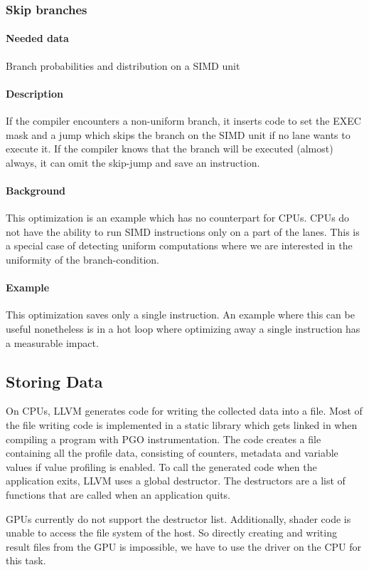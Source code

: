 \subsubsection{Skip branches}
\paragraph{Needed data} Branch probabilities and distribution on a SIMD unit
\paragraph{Description} If the compiler encounters a non-uniform branch, it inserts code to set the EXEC mask and a jump which skips the branch on the SIMD unit if no lane wants to execute it. If the compiler knows that the branch will be executed (almost) always, it can omit the skip-jump and save an instruction.
\paragraph{Background} This optimization is an example which has no counterpart for CPUs. CPUs do not have the ability to run SIMD instructions only on a part of the lanes. This is a special case of detecting uniform computations where we are interested in the uniformity of the branch-condition.
\paragraph{Example} This optimization saves only a single instruction. An example where this can be useful nonetheless is in a hot loop where optimizing away a single instruction has a measurable impact.

\subsection{Storing Data}
\label{sub:save-design}
On CPUs, LLVM generates code for writing the collected data into a file.
Most of the file writing code is implemented in a static library which gets linked in when compiling a program with PGO instrumentation.
The code creates a file containing all the profile data, consisting of counters, metadata and variable values if value profiling is enabled.
To call the generated code when the application exits, LLVM uses a global destructor.
The destructors are a list of functions that are called when an application quits.

GPUs currently do not support the destructor list. Additionally, shader code is unable to access the file system of the host.
So directly creating and writing result files from the GPU is impossible, we have to use the driver on the CPU for this task.

